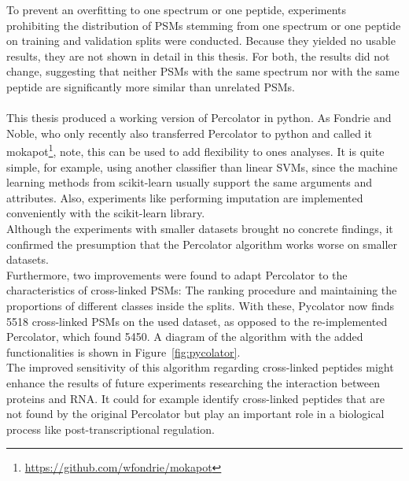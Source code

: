 To prevent an overfitting to one spectrum or one peptide, experiments prohibiting the distribution of PSMs stemming from one spectrum or one peptide on training and validation splits were conducted. Because they yielded no usable results, they are not shown in detail in this thesis. For both, the results did not change, suggesting that neither PSMs with the same spectrum nor with the same peptide are significantly more similar than unrelated PSMs.\\\\
This thesis produced a working version of Percolator in python. As Fondrie and Noble, who only recently also transferred Percolator to python and called it mokapot\footnote{\url{https://github.com/wfondrie/mokapot}}, note, this can be used to add flexibility to ones analyses. It is quite simple, for example, using another classifier than linear SVMs, since the machine learning methods from scikit-learn usually support the same arguments and attributes. Also, experiments like performing imputation are implemented conveniently with the scikit-learn library.\\
Although the experiments with smaller datasets brought no concrete findings, it confirmed the presumption that the Percolator algorithm works worse on smaller datasets.\\
Furthermore, two improvements were found to adapt Percolator to the characteristics of cross-linked PSMs: The ranking procedure and maintaining the proportions of different classes inside the splits. With these, Pycolator now finds 5518 cross-linked PSMs on the used dataset, as opposed to the re-implemented Percolator, which found 5450. A diagram of the algorithm with the added functionalities is shown in Figure~\ref{fig:pycolator}.\\
The improved sensitivity of this algorithm regarding cross-linked peptides might enhance the results of future experiments researching the interaction between proteins and RNA. It could for example identify cross-linked peptides that are not found by the original Percolator but play an important role in a biological process like post-transcriptional regulation.
\renewcommand{\baselinestretch}{0.9}
